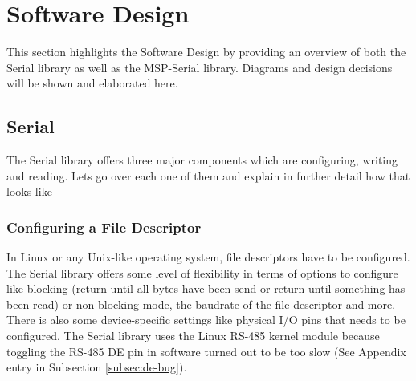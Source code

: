 \chapter{Software Design}

This section highlights the Software Design by providing an overview of both
the Serial library as well as the MSP-Serial library. Diagrams and design
decisions will be shown and elaborated here.

\section{Serial}

The Serial library offers three major components which are configuring, writing
and reading. Lets go over each one of them and explain in further detail how
that looks like 

\subsection{Configuring a File Descriptor}

In Linux or any Unix-like operating system, file descriptors have to be
configured. The Serial library offers some level of flexibility in terms of
options to configure like blocking (return until all bytes have been send or
return until something has been read) or non-blocking mode, the baudrate of the
file descriptor and more. There is also some device-specific settings like physical I/O
pins that needs to be configured. The Serial library uses the Linux RS-485
kernel module because toggling the RS-485 DE pin in software turned out to be
too slow (See Appendix entry in Subsection \ref{subsec:de-bug}).

